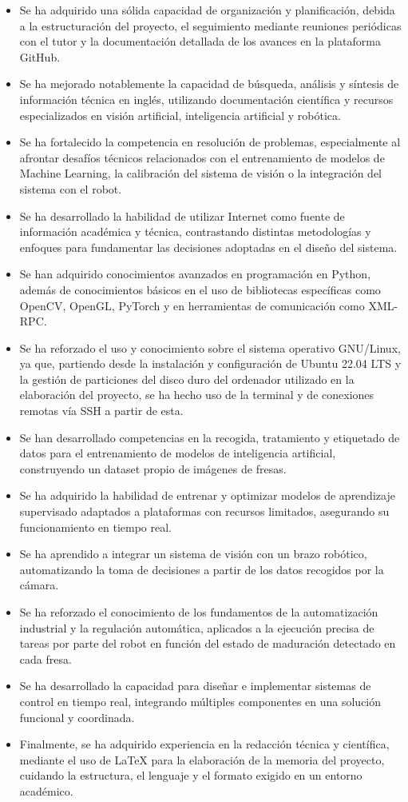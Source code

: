 \begin{itemize}
    \item Se ha adquirido una sólida capacidad de organización y planificación, debida a la estructuración del proyecto, el seguimiento mediante reuniones periódicas con el tutor y la documentación detallada de los avances en la plataforma GitHub.
    \item Se ha mejorado notablemente la capacidad de búsqueda, análisis y síntesis de información técnica en inglés, utilizando documentación científica y recursos especializados en visión artificial, inteligencia artificial y robótica.
    \item Se ha fortalecido la competencia en resolución de problemas, especialmente al afrontar desafíos técnicos relacionados con el entrenamiento de modelos de Machine Learning, la calibración del sistema de visión o la integración del sistema con el robot.
    \item Se ha desarrollado la habilidad de utilizar Internet como fuente de información académica y técnica, contrastando distintas metodologías y enfoques para fundamentar las decisiones adoptadas en el diseño del sistema.
    \item Se han adquirido conocimientos avanzados en programación en Python, además de conocimientos básicos en el uso de bibliotecas específicas como OpenCV, OpenGL, PyTorch y en herramientas de comunicación como XML-RPC.
    \item Se ha reforzado el uso y conocimiento sobre el sistema operativo GNU/Linux, ya que, partiendo desde la instalación y configuración de Ubuntu 22.04 LTS y la gestión de particiones del disco duro del ordenador utilizado en la elaboración del proyecto, se ha hecho uso de la terminal y de conexiones remotas vía SSH a partir de esta.
    \item Se han desarrollado competencias en la recogida, tratamiento y etiquetado de datos para el entrenamiento de modelos de inteligencia artificial, construyendo un dataset propio de imágenes de fresas.
    \item Se ha adquirido la habilidad de entrenar y optimizar modelos de aprendizaje supervisado adaptados a plataformas con recursos limitados, asegurando su funcionamiento en tiempo real.
    \item Se ha aprendido a integrar un sistema de visión con un brazo robótico, automatizando la toma de decisiones a partir de los datos recogidos por la cámara.
    \item Se ha reforzado el conocimiento de los fundamentos de la automatización industrial y la regulación automática, aplicados a la ejecución precisa de tareas por parte del robot en función del estado de maduración detectado en cada fresa.
    \item Se ha desarrollado la capacidad para diseñar e implementar sistemas de control en tiempo real, integrando múltiples componentes en una solución funcional y coordinada.
    \item Finalmente, se ha adquirido experiencia en la redacción técnica y científica, mediante el uso de LaTeX para la elaboración de la memoria del proyecto, cuidando la estructura, el lenguaje y el formato exigido en un entorno académico.
\end{itemize}

